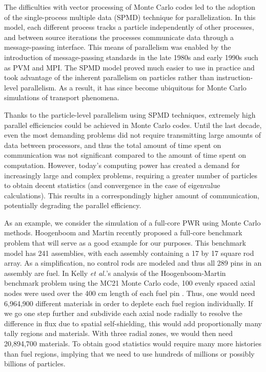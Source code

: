 \documentclass[11pt]{article}
\begin{document}
The difficulties with vector processing of Monte Carlo codes led to
the adoption of the single-process multiple data (SPMD) technique for
parallelization. In this model, each different process tracks a
particle independently of other processes, and between source
iterations the processes communicate data through a message-passing
interface. This means of parallelism was enabled by the
introduction of message-passing standards in the late 1980s and early
1990s such as PVM and MPI. The SPMD model proved much easier to use in
practice and took advantage of the inherent parallelism on particles
rather than instruction-level parallelism. As a result, it has since
become ubiquitous for Monte Carlo simulations of transport phenomena.

Thanks to the particle-level parallelism using SPMD techniques,
extremely high parallel efficiencies could be achieved in Monte Carlo
codes. Until the last decade, even the most demanding problems did not
require transmitting large amounts of data between processors, and
thus the total amount of time spent on communication was not
significant compared to the amount of time spent on
computation. However, today's computing power has created a demand for
increasingly large and complex problems, requiring a greater number of
particles to obtain decent statistics (and convergence in the case of
eigenvalue calculations). This results in a correspondingly higher
amount of communication, potentially degrading the parallel
efficiency.

As an example, we consider the simulation of a full-core PWR using
Monte Carlo methods. Hoogenboom and Martin recently proposed a
full-core benchmark problem \cite{hoogenboom} that will serve as a
good example for our purposes. This benchmark model has 241
assemblies, with each assembly containing a 17 by 17 square rod
array. As a simplification, no control rods are modeled and thus all
289 pins in an assembly are fuel. In Kelly {\em et al.}'s analysis of
the Hoogenboom-Martin benchmark problem using the MC21 Monte Carlo
code, 100 evenly spaced axial nodes were used over the 400 cm length
of each fuel pin \cite{kelly}. Thus, one would need 6,964,900
different materials in order to deplete each fuel region
individually. If we go one step further and subdivide each axial node
radially to resolve the difference in flux due to spatial
self-shielding, this would add proportionally many tally regions and
materials. With three radial zones, we would then need 20,894,700
materials. To obtain good statistics would require many more histories
than fuel regions, implying that we need to use hundreds of millions
or possibly billions of particles.
\end{document}
